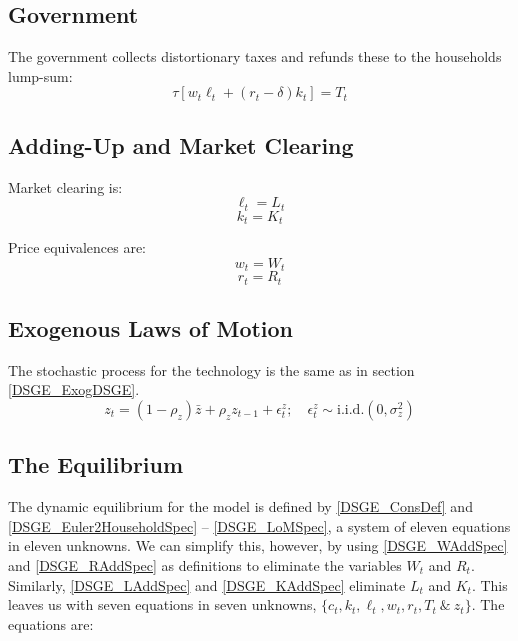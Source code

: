 \documentclass[letterpaper,12pt]{article}
\theoremstyle{definition}
\begin{document}
\begin{spacing}{1.5}
	\subsection{Government}
		The government collects distortionary taxes and refunds these to the households lump-sum:
		\begin{equation}\label{DSGE_GovtBC2FirmSpec}
		\tau \left[w_t\ell_t+(r_t-\delta)k_t\right] = T_t
		\end{equation}

		\subsection{Adding-Up and Market Clearing}
		Market clearing is:
		\begin{equation}\label{DSGE_LAddSpec}
		\ell_t = L_t
		\end{equation}
		\begin{equation}\label{DSGE_KAddSpec}
		k_t = K_t
		\end{equation}

		Price equivalences are:
		\begin{equation}\label{DSGE_WAddSpec}
		w_t = W_t
		\end{equation}
		\begin{equation}\label{DSGE_RAddSpec}
		r_t  = R_t
		\end{equation}

	\subsection{Exogenous Laws of Motion}
		The stochastic process for the technology is the same as in section \ref{DSGE_ExogDSGE}.
		\begin{equation}\label{DSGE_LoMSpec}
		z_t = (1-\rho_z)\bar z +  \rho_z z_{t-1}+ \epsilon^z_t ;\quad \epsilon^z_t\sim\text{i.i.d.}(0,\sigma_z^2)
		\end{equation}

	\subsection{The Equilibrium}
		The dynamic equilibrium for the model is defined by \eqref{DSGE_ConsDef} and \eqref{DSGE_Euler2HouseholdSpec} -- \eqref{DSGE_LoMSpec}, a system of eleven equations in eleven unknowns. We can simplify this, however, by using \eqref{DSGE_WAddSpec} and \eqref{DSGE_RAddSpec} as definitions to eliminate the variables $W_t$ and $R_t$. Similarly, \eqref{DSGE_LAddSpec} and \eqref{DSGE_KAddSpec} eliminate $L_t$ and $K_t$. This leaves us with seven equations in seven unknowns, $\{c_t,k_t,\ell_t,w_t,r_t,T_t\>\&\>z_t\}$. The equations are:


\end{spacing}
\end{document}
